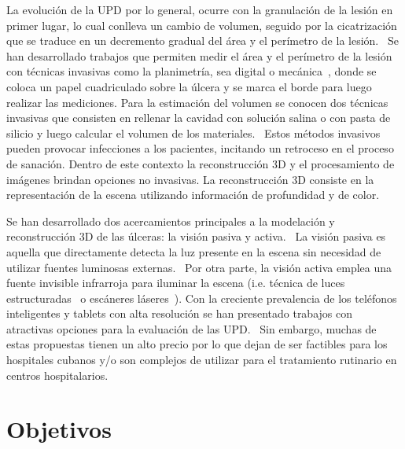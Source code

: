 La evolución de la UPD por lo general, ocurre con la granulación de la lesión en primer lugar, lo cual conlleva un cambio de volumen, seguido por la cicatrización que se traduce en un decremento gradual del área y el perímetro de la lesión.~\cite{kecelj2007measurement} Se han desarrollado trabajos que permiten medir el área y el perímetro de la lesión con técnicas invasivas como la planimetría, sea digital o mecánica~\cite{oien2002measuring}, donde se coloca un papel cuadriculado sobre la úlcera y se marca el borde para luego realizar las mediciones. Para la estimación del volumen se conocen dos técnicas invasivas que consisten en rellenar la cavidad con solución salina o con pasta de silicio y luego calcular el volumen de los materiales.~\cite{langemo2008measuring} Estos métodos invasivos pueden provocar infecciones a los pacientes, incitando un retroceso en el proceso de sanación. Dentro de este contexto la reconstrucción 3D y el procesamiento de imágenes brindan opciones no invasivas. La reconstrucción 3D consiste en la representación de la escena utilizando información de profundidad y de color.

Se han desarrollado dos acercamientos principales a la modelación y reconstrucción 3D de las úlceras: la visión pasiva y activa.~\cite{zenteno2018volumetric} La visión pasiva es aquella que directamente detecta la luz presente en la escena sin necesidad de utilizar fuentes luminosas externas.~\cite{malian2004medphos,plassmann1998mavis} Por otra parte, la visión activa emplea una fuente invisible infrarroja para iluminar la escena (i.e. técnica de luces estructuradas~\cite{filko2018wound, ching2022segm3d, ozturk1996new} o escáneres láseres~\cite{callieri2003derma, krouskop2002noncontact}). Con la creciente prevalencia de los teléfonos inteligentes y tablets con alta resolución se han presentado trabajos con atractivas opciones para la evaluación de las UPD.~\cite{foltynski2014new, wang2014smartphone} Sin embargo, muchas de estas propuestas tienen un alto precio por lo que dejan de ser factibles para los hospitales cubanos y/o son complejos de utilizar para el tratamiento rutinario en centros hospitalarios.

\section*{Objetivos}

